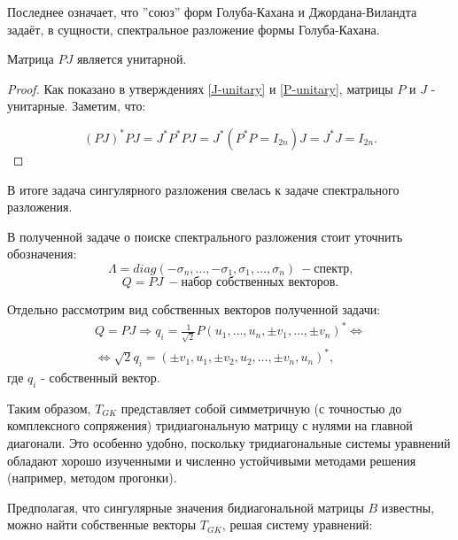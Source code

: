 Последнее означает, что ''союз'' форм Голуба-Кахана и Джордана-Виландта задаёт, в сущности, спектральное разложение формы Голуба-Кахана.


\begin{claim}
     Матрица \(PJ\) является унитарной.
\end{claim}
\begin{proof}
   Как показано в утверждениях  \ref{J-unitary} и \ref{P-unitary},  матрицы \(P\) и \(J\) - унитарные. Заметим, что:

    \[(PJ)^*PJ=J^* P^* P J=J^* (P^* P=I_{2n}) J=J^*J=I_{2n}.\]
    
\end{proof}


В итоге задача сингулярного разложения свелась к задаче спектрального разложения. 

\begin{note}
    В полученной задаче о поиске спектрального разложения стоит уточнить обозначения:
    \[
        \Lambda = diag(-\sigma_n,\dots,-\sigma_1,\sigma_1,\dots,\sigma_n) \ - \text{спектр,} 
    \]
    \[
        Q=PJ \ - \text{набор собственных векторов.}
    \]
\end{note}

Отдельно рассмотрим вид собственных векторов полученной задачи:
\begin{equation} \label{eq:eigenvector}
    \begin{split}
        Q=PJ \Rightarrow q_{i}=\frac{1}{\sqrt{2}}P(u_1,\dots,u_n,\pm v_1,\dots,\pm v_n)^* \Leftrightarrow \\[6pt]  \Leftrightarrow \sqrt{2}q_i=(\pm v_1,u_1,\pm v_2,u_2,\dots,\pm v_n,u_n)^*, 
    \end{split}
\end{equation}
где \(q_i\) - собственный вектор.


Таким образом, \( T_{GK} \) представляет собой симметричную (с точностью до комплексного сопряжения) тридиагональную матрицу с нулями на главной диагонали. Это особенно удобно, поскольку тридиагональные системы уравнений обладают хорошо изученными и численно устойчивыми методами решения (например, методом прогонки).


Предполагая, что сингулярные значения бидиагональной матрицы \( B \) известны, можно найти собственные векторы \( T_{GK} \), решая систему уравнений:

